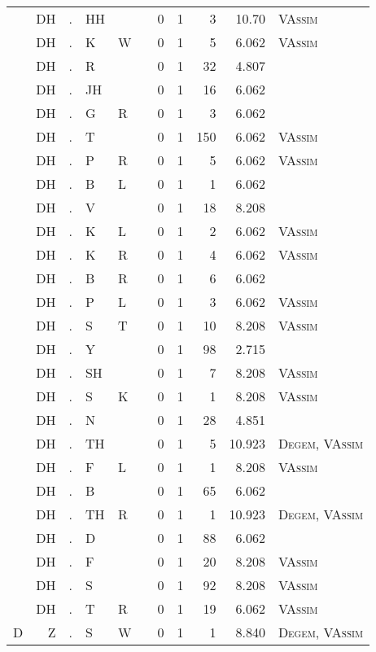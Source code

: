 \begin{longtable}{r@{ } r@{ } c@{ } l@{ } l@{ } l@{ } r r r r l }
 & DH & . & HH &  &  & 0 & 1 & 3 & 10.70 & \textsc{VAssim} \\
 & DH & . & K & W &  & 0 & 1 & 5 & 6.062 & \textsc{VAssim} \\
 & DH & . & R &  &  & 0 & 1 & 32 & 4.807 &  \\
 & DH & . & JH &  &  & 0 & 1 & 16 & 6.062 &  \\
 & DH & . & G & R &  & 0 & 1 & 3 & 6.062 &  \\
 & DH & . & T &  &  & 0 & 1 & 150 & 6.062 & \textsc{VAssim} \\
 & DH & . & P & R &  & 0 & 1 & 5 & 6.062 & \textsc{VAssim} \\
 & DH & . & B & L &  & 0 & 1 & 1 & 6.062 &  \\
 & DH & . & V &  &  & 0 & 1 & 18 & 8.208 &  \\
 & DH & . & K & L &  & 0 & 1 & 2 & 6.062 & \textsc{VAssim} \\
 & DH & . & K & R &  & 0 & 1 & 4 & 6.062 & \textsc{VAssim} \\
 & DH & . & B & R &  & 0 & 1 & 6 & 6.062 &  \\
 & DH & . & P & L &  & 0 & 1 & 3 & 6.062 & \textsc{VAssim} \\
 & DH & . & S & T &  & 0 & 1 & 10 & 8.208 & \textsc{VAssim} \\
 & DH & . & Y &  &  & 0 & 1 & 98 & 2.715 &  \\
 & DH & . & SH &  &  & 0 & 1 & 7 & 8.208 & \textsc{VAssim} \\
 & DH & . & S & K &  & 0 & 1 & 1 & 8.208 & \textsc{VAssim} \\
 & DH & . & N &  &  & 0 & 1 & 28 & 4.851 &  \\
 & DH & . & TH &  &  & 0 & 1 & 5 & 10.923 & \textsc{Degem}, \textsc{VAssim} \\
 & DH & . & F & L &  & 0 & 1 & 1 & 8.208 & \textsc{VAssim} \\
 & DH & . & B &  &  & 0 & 1 & 65 & 6.062 &  \\
 & DH & . & TH & R &  & 0 & 1 & 1 & 10.923 & \textsc{Degem}, \textsc{VAssim} \\
 & DH & . & D &  &  & 0 & 1 & 88 & 6.062 &  \\
 & DH & . & F &  &  & 0 & 1 & 20 & 8.208 & \textsc{VAssim} \\
 & DH & . & S &  &  & 0 & 1 & 92 & 8.208 & \textsc{VAssim} \\
 & DH & . & T & R &  & 0 & 1 & 19 & 6.062 & \textsc{VAssim} \\
D & Z & . & S & W &  & 0 & 1 & 1 & 8.840 & \textsc{Degem}, \textsc{VAssim} \\

\end{longtable}
